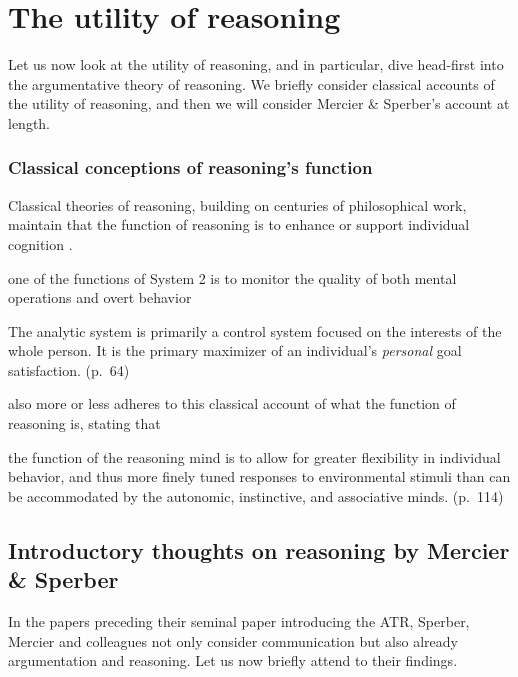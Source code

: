 \section{The utility of reasoning}
\label{sec:reason-function}

Let us now look at the utility of reasoning, and in particular, dive head-first into the argumentative theory of reasoning.
We briefly consider classical accounts of the utility of reasoning, and then we will consider Mercier \& Sperber's account at length.

\subsubsection{Classical conceptions of reasoning's function}

Classical theories of reasoning, building on centuries of philosophical work, maintain that the function of reasoning is to enhance or support individual cognition \citep{MS11}.

\begin{quoting}
    one of the functions of System 2 is to monitor the quality of both mental operations and overt behavior
    \hfill \citep[p.~699]{Kahneman03}
\end{quoting}

\begin{quoting}
    The analytic system is primarily a control system focused on the interests of the whole person. It is the primary maximizer of an individual's \emph{personal} goal satisfaction.
    (p.~64)
\end{quoting}

\citet{Goel22} also more or less adheres to this classical account of what the function of reasoning is, stating that
\begin{quoting}
    the function of the reasoning mind is to allow for greater flexibility in individual behavior, and thus more finely tuned responses to environmental stimuli than can be accommodated by the autonomic, instinctive, and associative minds.
    \hfill (p.~114)
\end{quoting}

\subsection{Introductory thoughts on reasoning by Mercier \& Sperber}


In the papers preceding their \citeyear{MS11} seminal paper introducing the ATR, Sperber, Mercier and colleagues not only consider communication but also already argumentation and reasoning. Let us now briefly attend to their findings.

